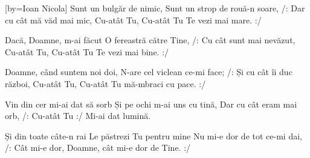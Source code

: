 [by={Ioan Nicola}]
\beginverse
Sunt un bulgăr de nimic,
Sunt un strop de rouă-n soare,
/: Dar cu cât mă văd mai mic,
Cu-atât Tu,
Cu-atât Tu Te vezi mai mare. :/
\endverse

\beginverse
Dacă, Doamne, m-ai făcut
O fereastră către Tine,
/: Cu cât sunt mai nevăzut,
Cu-atât Tu,
Cu-atât Tu Te vezi mai bine. :/
\endverse

\beginverse
Doamne, când suntem noi doi,
N-are cel viclean ce-mi face;
/: Și cu cât îi duc război,
Cu-atât Tu,
Cu-atât Tu mă-mbraci cu pace. :/
\endverse

\beginverse
Vin din cer mi-ai dat să sorb
Și pe ochi m-ai uns cu tină,
Dar cu cât eram mai orb,
/: Cu-atât Tu :/
Mi-ai dat lumină.
\endverse

\beginverse
Și din toate câte-n rai
Le păstrezi Tu pentru mine
Nu mi-e dor de tot ce-mi dai,
/: Cât mi-e dor,
Doamne, cât mi-e dor de Tine. :/
\endverse
\endsong